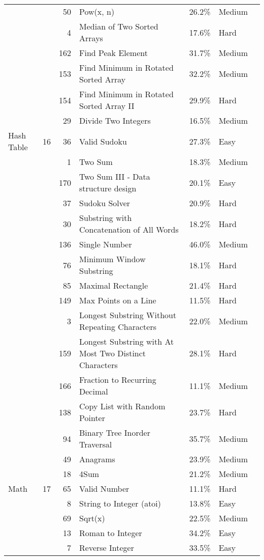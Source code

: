 \documentclass[9pt,b5paper]{article}
\begin{document}
\begin{center}
\begin{tabular}{lrrllll}
 &  & 50 & Pow(x, n) & 26.2\% & Medium & \\
 &  & 4 & Median of Two Sorted Arrays & 17.6\% & Hard & \\
 &  & 162 & Find Peak Element & 31.7\% & Medium & \\
 &  & 153 & Find Minimum in Rotated Sorted Array & 32.2\% & Medium & \\
 &  & 154 & Find Minimum in Rotated Sorted Array II & 29.9\% & Hard & \\
 &  & 29 & Divide Two Integers & 16.5\% & Medium & \\
\hline
Hash Table & 16 & 36 & Valid Sudoku & 27.3\% & Easy & \\
 &  & 1 & Two Sum & 18.3\% & Medium & \\
 &  & 170 & Two Sum III - Data structure design & 20.1\% & Easy & \\
 &  & 37 & Sudoku Solver & 20.9\% & Hard & \\
 &  & 30 & Substring with Concatenation of All Words & 18.2\% & Hard & \\
 &  & 136 & Single Number & 46.0\% & Medium & \\
 &  & 76 & Minimum Window Substring & 18.1\% & Hard & \\
 &  & 85 & Maximal Rectangle & 21.4\% & Hard & \\
 &  & 149 & Max Points on a Line & 11.5\% & Hard & \\
 &  & 3 & Longest Substring Without Repeating Characters & 22.0\% & Medium & \\
 &  & 159 & Longest Substring with At Most Two Distinct Characters & 28.1\% & Hard & \\
 &  & 166 & Fraction to Recurring Decimal & 11.1\% & Medium & \\
 &  & 138 & Copy List with Random Pointer & 23.7\% & Hard & \\
 &  & 94 & Binary Tree Inorder Traversal & 35.7\% & Medium & \\
 &  & 49 & Anagrams & 23.9\% & Medium & \\
 &  & 18 & 4Sum & 21.2\% & Medium & \\
\hline
Math & 17 & 65 & Valid Number & 11.1\% & Hard & \\
 &  & 8 & String to Integer (atoi) & 13.8\% & Easy & \\
 &  & 69 & Sqrt(x) & 22.5\% & Medium & \\
 &  & 13 & Roman to Integer & 34.2\% & Easy & \\
 &  & 7 & Reverse Integer & 33.5\% & Easy & \\

\end{tabular}
\end{center}
\end{document}
